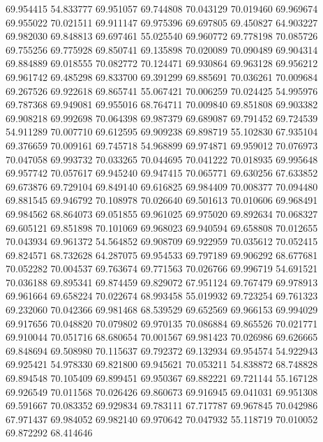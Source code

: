 69.954415
54.833777
69.951057
69.744808
70.043129
70.019460
69.969674
69.955022
70.021511
69.911147
69.975396
69.697805
69.450827
64.903227
69.982030
69.848813
69.697461
55.025540
69.960772
69.778198
70.085726
69.755256
69.775928
69.850741
69.135898
70.020089
70.090489
69.904314
69.884889
69.018555
70.082772
70.124471
69.930864
69.963128
69.956212
69.961742
69.485298
69.833700
69.391299
69.885691
70.036261
70.009684
69.267526
69.922618
69.865741
55.067421
70.006259
70.024425
54.995976
69.787368
69.949081
69.955016
68.764711
70.009840
69.851808
69.903382
69.908218
69.992698
70.064398
69.987379
69.689087
69.791452
69.724539
54.911289
70.007710
69.612595
69.909238
69.898719
55.102830
67.935104
69.376659
70.009161
69.745718
54.968899
69.974871
69.959012
70.076973
70.047058
69.993732
70.033265
70.044695
70.041222
70.018935
69.995648
69.957742
70.057617
69.945240
69.947415
70.065771
69.630256
67.633852
69.673876
69.729104
69.849140
69.616825
69.984409
70.008377
70.094480
69.881545
69.946792
70.108978
70.026640
69.501613
70.010606
69.968491
69.984562
68.864073
69.051855
69.961025
69.975020
69.892634
70.068327
69.605121
69.851898
70.101069
69.968023
69.940594
69.658808
70.012655
70.043934
69.961372
54.564852
69.908709
69.922959
70.035612
70.052415
69.824571
68.732628
64.287075
69.954533
69.797189
69.906292
68.677681
70.052282
70.004537
69.763674
69.771563
70.026766
69.996719
54.691521
70.036188
69.895341
69.874459
69.829072
67.951124
69.767479
69.978913
69.961664
69.658224
70.022674
68.993458
55.019932
69.723254
69.761323
69.232060
70.042366
69.981468
68.539529
69.652569
69.966153
69.994029
69.917656
70.048820
70.079802
69.970135
70.086884
69.865526
70.021771
69.910044
70.051716
68.680654
70.001567
69.981423
70.026986
69.626665
69.848694
69.508980
70.115637
69.792372
69.132934
69.954574
54.922943
69.925421
54.978330
69.821800
69.945621
70.053211
54.838872
68.748828
69.894548
70.105409
69.899451
69.950367
69.882221
69.721144
55.167128
69.926549
70.011568
70.026426
69.860673
69.916945
69.041031
69.951308
69.591667
70.083352
69.929834
69.783111
67.717787
69.967845
70.042986
67.971437
69.984052
69.982140
69.970642
70.047932
55.118719
70.010052
69.872292
68.414646
